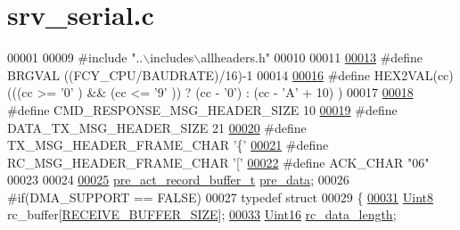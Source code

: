 \hypertarget{a00030_source}{\section{srv\+\_\+serial.\+c}
\label{a00030_source}
}

\begin{DoxyCode}
00001 
00009 \textcolor{preprocessor}{#include "..\(\backslash\)includes\(\backslash\)allheaders.h"} 
00010 
00011 
\hypertarget{a00030_source_l00013}{}\hyperlink{a00030_aca346e181d2ffc089e22e75736a6ff63}{00013} \textcolor{preprocessor}{#define BRGVAL          ((FCY\_CPU/BAUDRATE)/16)-1}
00014 
\hypertarget{a00030_source_l00016}{}\hyperlink{a00030_a428b04d2e2f2da2ea031a6c731660a71}{00016} \textcolor{preprocessor}{#define HEX2VAL(cc)  (((cc >= '0' ) && (cc <= '9' )) ? (cc - '0') : (cc - 'A' + 10) )}
00017 
\hypertarget{a00030_source_l00018}{}\hyperlink{a00030_a70cf18090d97bf40a74a6ff7fd56d888}{00018} \textcolor{preprocessor}{#define CMD\_RESPONSE\_MSG\_HEADER\_SIZE     10}
\hypertarget{a00030_source_l00019}{}\hyperlink{a00030_a7704c8abe93ef4188dd1562167bdbe63}{00019} \textcolor{preprocessor}{#define DATA\_TX\_MSG\_HEADER\_SIZE          21}
\hypertarget{a00030_source_l00020}{}\hyperlink{a00030_ae744e762e849a4701bf982655b5dc2db}{00020} \textcolor{preprocessor}{#define TX\_MSG\_HEADER\_FRAME\_CHAR         '\{'}
\hypertarget{a00030_source_l00021}{}\hyperlink{a00030_a5470c21188de014a742af7a64aeb23a0}{00021} \textcolor{preprocessor}{#define RC\_MSG\_HEADER\_FRAME\_CHAR         '['}
\hypertarget{a00030_source_l00022}{}\hyperlink{a00030_a2c59f95209427bfe2c53a30515cfbeda}{00022} \textcolor{preprocessor}{#define ACK\_CHAR                         "06"}
00023 
00024 
\hypertarget{a00030_source_l00025}{}\hyperlink{a00030_a448db071f92912b830a4aabd08c45d0c}{00025} \hyperlink{a00022_da/dc3/a00657}{pre\_act\_record\_buffer\_t} \hyperlink{a00030_a448db071f92912b830a4aabd08c45d0c}{pre\_data};
00026 \textcolor{preprocessor}{#if(DMA\_SUPPORT == FALSE)}
00027 \textcolor{keyword}{typedef} \textcolor{keyword}{struct}
00029 \{
\hypertarget{a00030_source_l00031}{}\hyperlink{a00030_ac734cb8be27f86bd99edc539434883a4}{00031}     \hyperlink{a00072_af84840501dec18061d18a68c162a8fa2}{Uint8}     rc\_buffer[\hyperlink{a00031_aa49ab378520c95fea987f93a7f3c9abf}{RECEIVE\_BUFFER\_SIZE}];
\hypertarget{a00030_source_l00033}{}\hyperlink{a00030_ab136d4fef2c523afd55b6ca74c46d7cc}{00033}     \hyperlink{a00072_a59a9f6be4562c327cbfb4f7e8e18f08b}{Uint16}    \hyperlink{a00030_ab136d4fef2c523afd55b6ca74c46d7cc}{rc\_data\_length};

\end{DoxyCode}
